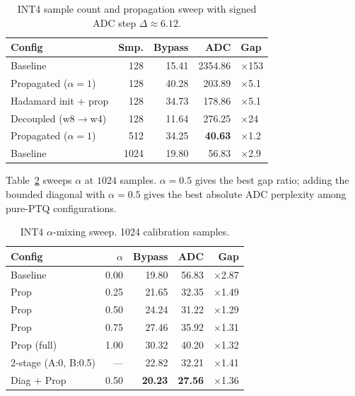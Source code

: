 \documentclass[letterpaper]{article} %
\theoremstyle{plain}
\begin{document}
\begin{table}[htbp]
\centering
\setlength{\tabcolsep}{4pt}
\begin{tabular}{@{}lrrrl@{}}
\toprule
\textbf{Config} & \textbf{Smp.} & \textbf{Bypass} & \textbf{ADC} & \textbf{Gap} \\
\midrule
Baseline                  & 128  & 15.41 & 2354.86 & $\times$153 \\
Propagated ($\alpha=1$)   & 128  & 40.28 & 203.89  & $\times$5.1 \\
Hadamard init + prop      & 128  & 34.73 & 178.86  & $\times$5.1 \\
Decoupled (w8$\to$w4)     & 128  & 11.64 & 276.25  & $\times$24 \\
Propagated ($\alpha=1$)   & 512  & 34.25 & \textbf{40.63} & $\times$1.2 \\
Baseline                  & 1024 & 19.80 & 56.83   & $\times$2.9 \\
\bottomrule
\end{tabular}
\caption{INT4 sample count and propagation sweep with signed ADC step $\Delta\approx6.12$.}
\label{tab:int4v1}
\end{table}

Table~\ref{tab:int4v2} sweeps $\alpha$ at $1024$ samples. $\alpha=0.5$ gives the best gap ratio; adding the bounded diagonal with $\alpha=0.5$ gives the best absolute ADC perplexity among pure-PTQ configurations.

\begin{table}[htbp]
\centering
\begin{tabular}{@{}lrrrr@{}}
\toprule
\textbf{Config} & \textbf{$\alpha$} & \textbf{Bypass} & \textbf{ADC} & \textbf{Gap} \\
\midrule
Baseline                  & 0.00 & 19.80 & 56.83 & $\times$2.87 \\
Prop                      & 0.25 & 21.65 & 32.35 & $\times$1.49 \\
Prop                      & 0.50 & 24.24 & 31.22 & $\times$1.29 \\
Prop                      & 0.75 & 27.46 & 35.92 & $\times$1.31 \\
Prop (full)               & 1.00 & 30.32 & 40.20 & $\times$1.32 \\
2-stage (A:0, B:0.5)      & ---  & 22.82 & 32.21 & $\times$1.41 \\
Diag + Prop               & 0.50 & \textbf{20.23} & \textbf{27.56} & $\times$1.36 \\
\bottomrule
\end{tabular}
\caption{INT4 $\alpha$-mixing sweep. 1024 calibration samples.}
\label{tab:int4v2}
\end{table}
\end{document}
